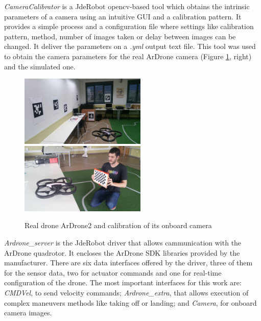\documentclass{styles/svproc}
\begin{document}
 \textit{CameraCalibrator} is a JdeRobot opencv-based tool which obtains the intrinsic parameters of a camera using an intuitive GUI and a calibration pattern. It provides a simple process and a configuration file where settings like calibration pattern, method, number of images taken or delay between images can be changed. It deliver the parameters on a \textit{.yml} output text file.
This tool was used to obtain the camera parameters for the real ArDrone camera (Figure \ref{fig:calibration}, right) and the simulated one.

	\begin{figure}[h]
		\begin{center}
                  {\includegraphics[width=6cm]{realnavigation.png}}
                  {\includegraphics[width=6cm]{calibration.jpg}}
		\end{center}
		\caption{Real drone ArDrone2 and calibration of its onboard camera}
                \label{fig:calibration}
	\end{figure}
        
	\textit{Ardrone\_server} is the JdeRobot driver that allows cammunication with the ArDrone quadrotor. It encloses the ArDrone SDK libraries provided by the manufacturer. There are six data interfaces offered by the driver, three of them for the sensor data, two for actuator commands and one for real-time configuration of the drone. The most important interfaces for this work are: \textit{CMDVel}, to send velocity commands; \textit{Ardrone\_extra}, that allows execution of complex maneuvers methods like taking off or landing; and \textit{Camera}, for onboard camera images.
\end{document}
